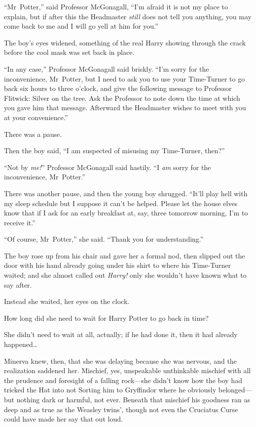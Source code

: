 “Mr~Potter,” said Professor McGonagall, “I’m afraid it is not my place to
explain, but if after this the Headmaster \emph{still} does not tell you
anything, you may come back to me and I will go yell at him for you.”

The boy’s eyes widened, something of the real Harry showing through the crack
before the cool mask was set back in place.

“In any case,” Professor McGonagall said briskly. “I’m sorry for the
inconvenience, Mr~Potter, but I need to ask you to use your Time-Turner to go
back six hours to three o’clock, and give the following message to Professor
Flitwick: Silver on the tree. Ask the Professor to note down the time at which
you gave him that message. Afterward the Headmaster wishes to meet with you at
your convenience.”

There was a pause.

Then the boy said, “I am suspected of misusing my Time-Turner, then?”

“Not by \emph{me!}” Professor McGonagall said hastily. “I \emph{am} sorry for
the inconvenience, Mr~Potter.”

There was another pause, and then the young boy shrugged. “It’ll play hell with
my sleep schedule but I suppose it can’t be helped. Please let the house elves
know that if I ask for an early breakfast at, say, three \AM tomorrow morning,
I’m to receive it.”

“Of course, Mr~Potter,” she said. “Thank you for understanding.”

The boy rose up from his chair and gave her a formal nod, then slipped out the
door with his hand already going under his shirt to where his Time-Turner
waited; and she almost called out \emph{Harry!} only she wouldn’t have known
what to say after.

Instead she waited, her eyes on the clock.

How long did she need to wait for Harry Potter to go back in time?

She didn’t need to wait at all, actually; if he had done it, then it had
already happened…

Minerva knew, then, that she was delaying because she was nervous, and the
realization saddened her. Mischief, yes, unspeakable unthinkable mischief with
all the prudence and foresight of a falling rock—she didn’t know how the boy
had tricked the Hat into not Sorting him to Gryffindor where he obviously
belonged—but nothing dark or harmful, not ever. Beneath that mischief his
goodness ran as deep and as true as the Weasley twins’, though not even the
Cruciatus Curse could have made her say that out loud.

